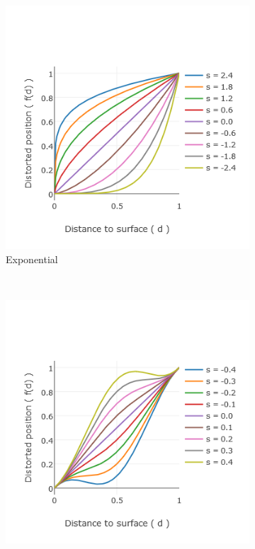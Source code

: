 \begin{figure}[h]
    \centering
    \begin{subfigure}[b]{.45\textwidth}
        \includegraphics[width=\textwidth]{Figures/exponential_distortion.png}
        \caption{Exponential}
        \label{fig:otherDistortionsExp}
    \end{subfigure}
    ~
    \begin{subfigure}[b]{.45\textwidth}
        \includegraphics[width=\textwidth]{Figures/cosine_distortion.png}

\end{subfigure}
\end{figure}
